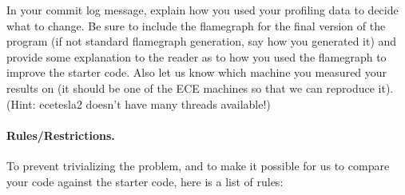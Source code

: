 In your commit log message, explain how you used your profiling data to decide what to change. Be sure to include the flamegraph for the final version of the program (if not standard flamegraph generation, say how you generated it) and provide some explanation to the reader as to how you used the flamegraph to improve the starter code. Also let us know which machine you measured your results on (it should be one of the ECE machines so that we can reproduce it). (Hint: ecetesla2 doesn't have many threads available!)


\paragraph {Rules/Restrictions.} To prevent trivializing the problem, and to make it possible for us to compare your code against the starter code, here is a list of rules:

